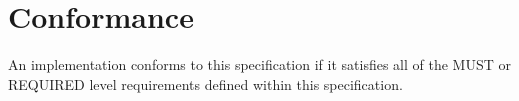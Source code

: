 \chapter{Conformance}

An implementation conforms to this specification if it satisfies
all of the MUST or REQUIRED level requirements defined within
this specification.
